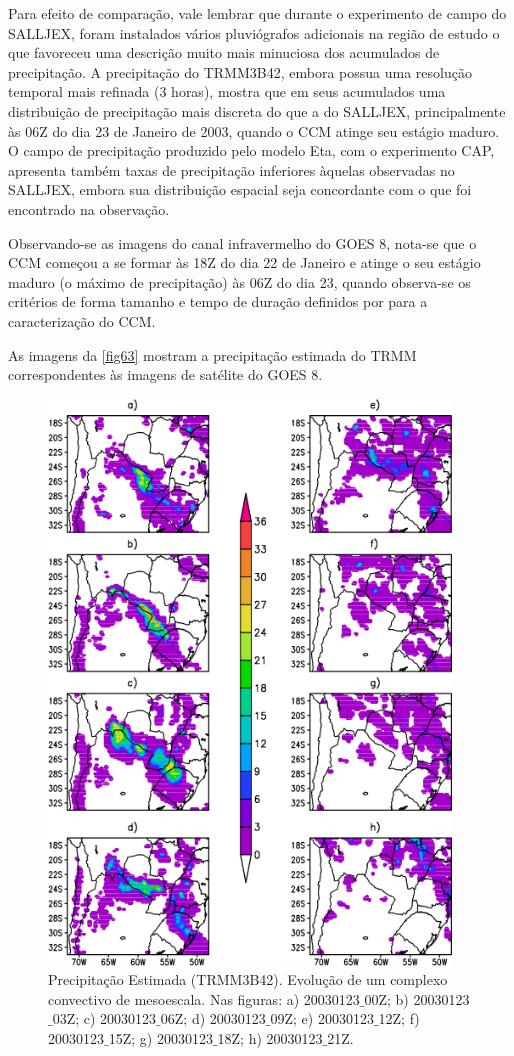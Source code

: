 Para efeito de comparação, vale lembrar que durante o experimento de campo do SALLJEX, foram instalados vários pluviógrafos adicionais na região de estudo o que favoreceu uma descrição muito mais minuciosa dos acumulados de precipitação. A precipitação do TRMM3B42, embora possua uma resolução temporal mais refinada (3 horas), mostra que em seus acumulados uma distribuição de precipitação mais discreta do que a do SALLJEX, principalmente às 06Z do dia 23 de Janeiro de 2003, quando o CCM atinge seu estágio maduro. O campo de precipitação produzido pelo modelo Eta, com o experimento CAP, apresenta também taxas de precipitação inferiores àquelas observadas no SALLJEX, embora sua distribuição espacial seja concordante com o que foi encontrado na observação.

Observando-se as imagens do canal infravermelho do GOES 8, nota-se que o CCM começou a se formar às 18Z do dia 22 de Janeiro e atinge o seu estágio maduro (o máximo de precipitação) às 06Z do dia 23, quando observa-se os critérios de forma tamanho e tempo de duração definidos por  para a caracterização do CCM.

As imagens da \autoref{fig63} mostram a precipitação estimada do TRMM correspondentes às imagens de satélite do GOES 8.

\begin{figure}[!hpb]
\centering
\includegraphics[height=15cm]{./figs/prec_trmm3b42.png}
\caption{Precipitação Estimada (TRMM3B42). Evolução de um complexo convectivo de mesoescala. Nas figuras: a) 20030123$\_$00Z; b) 20030123$\_$03Z; c) 20030123$\_$06Z; d) 20030123$\_$09Z; e) 20030123$\_$12Z; f) 20030123$\_$15Z; g) 20030123$\_$18Z; h) 20030123$\_$21Z.}
\label{fig63}
\end{figure}

